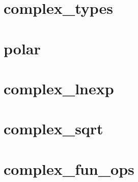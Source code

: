 \documentclass{article}
\begin{document}
\newpage
\section{complex\_types}\label{complex_types}
\newpage
\section{polar}\label{polar}
\newpage
\section{complex\_lnexp}\label{complex_lnexp}
\newpage
\section{complex\_sqrt}\label{complex_sqrt}
\newpage
\section{complex\_fun_ops}\label{complex_fun_ops}
\end{document}
